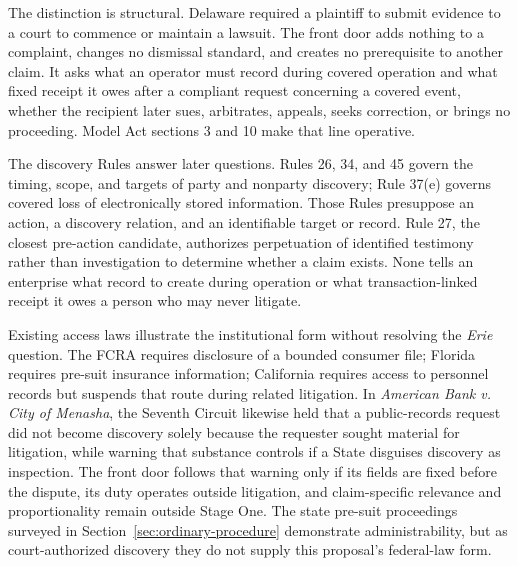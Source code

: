 The distinction is structural. Delaware required a plaintiff to submit evidence to a court to commence or maintain a lawsuit. The front door adds nothing to a complaint, changes no dismissal standard, and creates no prerequisite to another claim. It asks what an operator must record during covered operation and what fixed receipt it owes after a compliant request concerning a covered event, whether the recipient later sues, arbitrates, appeals, seeks correction, or brings no proceeding. Model Act sections 3 and 10 make that line operative.

The discovery Rules answer later questions. Rules 26, 34, and 45 govern the timing, scope, and targets of party and nonparty discovery; Rule 37(e) governs covered loss of electronically stored information. Those Rules presuppose an action, a discovery relation, and an identifiable target or record. Rule 27, the closest pre-action candidate, authorizes perpetuation of identified testimony rather than investigation to determine whether a claim exists. None tells an enterprise what record to create during operation or what transaction-linked receipt it owes a person who may never litigate.

Existing access laws illustrate the institutional form without resolving the \emph{Erie} question. The FCRA requires disclosure of a bounded consumer file; Florida requires pre-suit insurance information; California requires access to personnel records but suspends that route during related litigation. In \emph{American Bank v. City of Menasha}, the Seventh Circuit likewise held that a public-records request did not become discovery solely because the requester sought material for litigation, while warning that substance controls if a State disguises discovery as inspection. The front door follows that warning only if its fields are fixed before the dispute, its duty operates outside litigation, and claim-specific relevance and proportionality remain outside Stage One. The state pre-suit proceedings surveyed in Section~\ref{sec:ordinary-procedure} demonstrate administrability, but as court-authorized discovery they do not supply this proposal's federal-law form.


